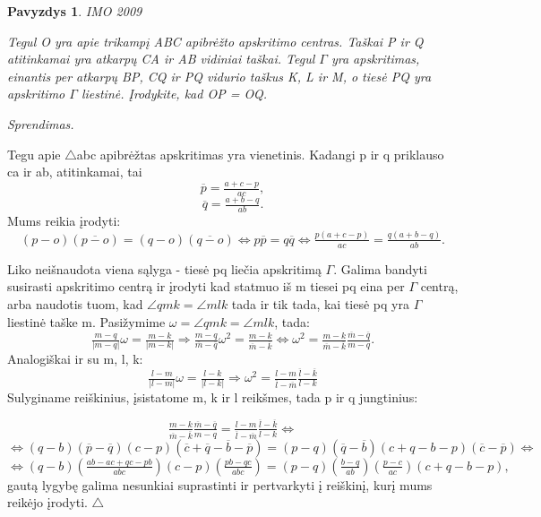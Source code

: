 \documentclass[11pt,a4paper,twoside]{book}
\newenvironment{sprendimas}{\noindent \textit{Sprendimas.}}{\hfill $\triangle$}
\newcounter{foo}[subsection]
\newtheorem{pavnr}[foo]{Pavyzdys}
\theoremstyle{definition} \newtheorem*{api}{Apibrėžimas}
\theoremstyle{remark} \newtheorem*{pastaba}{Pastaba}
\begin{document}
\begin{pavnr}
IMO 2009

Tegul O yra apie trikampį ABC apibrėžto apskritimo
centras. Taškai P ir Q atitinkamai yra atkarpų CA ir AB vidiniai
taškai. Tegul $\Gamma$ yra apskritimas, einantis per atkarpų BP, CQ ir
PQ vidurio taškus K, L ir M, o tiesė PQ yra apskritimo $\Gamma$ liestinė.
Įrodykite, kad OP = OQ.
\end{pavnr}
\begin{sprendimas}

Tegu apie $\bigtriangleup$abc apibrėžtas apskritimas yra vienetinis. Kadangi p ir q priklauso ca ir ab, atitinkamai, tai
\begin{equation*}
\overline{p}=\tfrac{a+c-p}{ac},
\end{equation*}
\begin{equation*}
\overline{q}=\tfrac{a+b-q}{ab}.
\end{equation*}
Mums reikia įrodyti:
\begin{equation*}
(p-o)(\overline{p-o})=(q-o)(\overline{q-o}) \Leftrightarrow p\overline{p}=q\overline{q} \Leftrightarrow \tfrac{p(a+c-p)}{ac}=\tfrac{q(a+b-q)}{ab}.
\end{equation*}

Liko neišnaudota viena sąlyga - tiesė pq liečia apskritimą $\Gamma$. Galima bandyti susirasti apskritimo centrą ir įrodyti kad statmuo iš m tiesei pq eina per $\Gamma$ centrą, arba naudotis tuom, kad $\angle qmk=\angle mlk$ tada ir tik tada, kai tiesė pq yra $\Gamma$ liestinė taške m. Pasižymime $\omega=\angle qmk=\angle mlk$, tada:
\begin{equation*}
\tfrac{m-q}{|m-q|}\omega=\tfrac{m-k}{|m-k|} \Rightarrow \tfrac{m-q}{\overline{m}-\overline{q}}\omega^2=\tfrac{m-k}{\overline{m}-\overline{k}} \Leftrightarrow \omega^2=\tfrac{m-k}{\overline{m}-\overline{k}} \tfrac{\overline{m}-\overline{q}}{m-q}.
\end{equation*}
Analogiškai ir su m, l, k:
\begin{equation*}
\tfrac{l-m}{|l-m|}\omega=\tfrac{l-k}{|l-k|} \Rightarrow  \omega^2=\tfrac{l-m}{\overline{l}-\overline{m}}\tfrac{\overline{l}-\overline{k}}{l-k}
\end{equation*}
Sulyginame reiškinius, įsistatome m, k ir l reikšmes, tada p ir q jungtinius:

\begin{equation*}
 \tfrac{m-k}{\overline{m}-\overline{k}} \tfrac{\overline{m}-\overline{q}}{m-q}=\tfrac{l-m}{\overline{l}-\overline{m}}\tfrac{\overline{l}-\overline{k}}{l-k} \Leftrightarrow 
\end{equation*}
\begin{equation*}
 \Leftrightarrow (q-b)(\overline{p}-\overline{q})(c-p)(\overline{c}+\overline{q}-\overline{b}-\overline{p})=(p-q)(\overline{q}-\overline{b})(c+q-b-p)(\overline{c}-\overline{p}) \Leftrightarrow
\end{equation*}
\begin{equation*}
\Leftrightarrow (q-b)(\tfrac{ab-ac+qc-pb}{abc})(c-p)(\tfrac{pb-qc}{abc})=(p-q)(\tfrac{b-q}{ab})(\tfrac{p-c}{ac})(c+q-b-p),
\end{equation*}
gautą lygybę galima nesunkiai suprastinti ir pertvarkyti į reiškinį, kurį mums reikėjo įrodyti.
\end{sprendimas}
\end{document}
